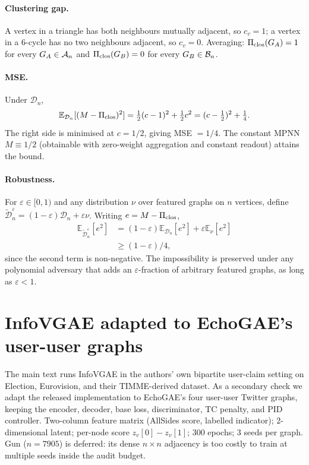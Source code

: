 \paragraph{Clustering gap.} A vertex in a triangle has both
neighbours mutually adjacent, so $c_v = 1$; a vertex in a $6$-cycle
has no two neighbours adjacent, so $c_v = 0$. Averaging:
$\Pi_{\mathrm{clos}}(G_A) = 1$ for every $G_A \in \mathcal{A}_n$ and
$\Pi_{\mathrm{clos}}(G_B) = 0$ for every $G_B \in \mathcal{B}_n$.

\paragraph{MSE.} Under $\mathcal{D}_n$,
\[
\mathbb{E}_{\mathcal{D}_n}[(M - \Pi_{\mathrm{clos}})^2] =
\tfrac{1}{2}(c - 1)^2 + \tfrac{1}{2}c^2 = (c - \tfrac{1}{2})^2 + \tfrac{1}{4}.
\]
The right side is minimised at $c = 1/2$, giving MSE $= 1/4$. The
constant MPNN $M \equiv 1/2$ (obtainable with zero-weight
aggregation and constant readout) attains the bound.

\paragraph{Robustness.} For $\varepsilon \in [0, 1)$ and any
distribution $\nu$ over featured graphs on $n$ vertices, define
$\tilde{\mathcal{D}}_n^\varepsilon = (1 - \varepsilon) \mathcal{D}_n
+ \varepsilon \nu$. Writing $e = M - \Pi_{\mathrm{clos}}$,
\begin{align*}
\mathbb{E}_{\tilde{\mathcal{D}}_n^\varepsilon}[e^2]
&= (1 - \varepsilon) \mathbb{E}_{\mathcal{D}_n}[e^2]
 + \varepsilon \mathbb{E}_\nu[e^2] \\
&\ge (1 - \varepsilon)/4,
\end{align*}
since the second term is non-negative. The impossibility is
preserved under any polynomial adversary that adds an
$\varepsilon$-fraction of arbitrary featured graphs, as long as
$\varepsilon < 1$.

\section{InfoVGAE adapted to EchoGAE's user-user graphs}\label{app:infovgae-adapt}

The main text runs InfoVGAE in the authors' own bipartite
user-claim setting on Election, Eurovision, and their
TIMME-derived dataset. As a secondary check we adapt the
released implementation to EchoGAE's four user-user Twitter
graphs, keeping the encoder, decoder, base loss, discriminator,
TC penalty, and PID controller. Two-column feature matrix
(AllSides score, labelled indicator); $2$-dimensional latent;
per-node score $z_v[0] - z_v[1]$; $300$ epochs; $3$ seeds per
graph. Gun ($n = 7905$) is deferred: its dense $n \times n$
adjacency is too costly to train at multiple seeds inside the
audit budget.

